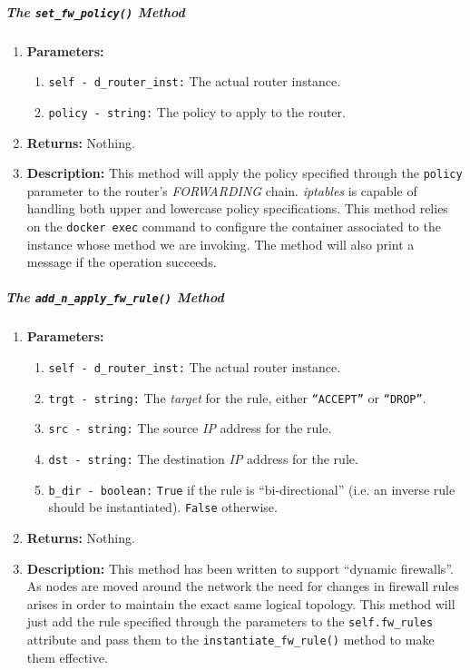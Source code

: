         \subparagraph{The \texttt{set\_fw\_policy()} Method}
            \begin{enumerate}
                \item \textbf{Parameters:}
                \begin{enumerate}
                    \item \texttt{self - d\_router\_inst:} The actual router instance.
                    \item \texttt{policy - string:} The policy to apply to the router.
                \end{enumerate}
                \item \textbf{Returns:} Nothing.
                \item \textbf{Description:} This method will apply the policy specified through the \texttt{policy} parameter to the router's \textit{FORWARDING} chain. \textit{iptables} is capable of handling both upper and lowercase policy specifications. This method relies on the \texttt{docker exec} command to configure the container associated to the instance whose method we are invoking. The method will also print a message if the operation succeeds.
            \end{enumerate}

        \subparagraph{The \texttt{add\_n\_apply\_fw\_rule()} Method}
            \begin{enumerate}
                \item \textbf{Parameters:}
                \begin{enumerate}
                    \item \texttt{self - d\_router\_inst:} The actual router instance.
                    \item \texttt{trgt - string:} The \textit{target} for the rule, either \texttt{``ACCEPT''} or \texttt{``DROP''}.
                    \item \texttt{src - string:} The source \textit{IP} address for the rule.
                    \item \texttt{dst - string:} The destination \textit{IP} address for the rule.
                    \item \texttt{b\_dir - boolean:} \texttt{True} if the rule is ``bi-directional'' (i.e. an inverse rule should be instantiated). \texttt{False} otherwise.
                \end{enumerate}
                \item \textbf{Returns:} Nothing.
                \item \textbf{Description:} This method has been written to support ``dynamic firewalls''. As nodes are moved around the network the need for changes in firewall rules arises in order to maintain the exact same logical topology. This method will just add the rule specified through the parameters to the \texttt{self.fw\_rules} attribute and pass them to the \texttt{instantiate\_fw\_rule()} method to make them effective.
            \end{enumerate}

